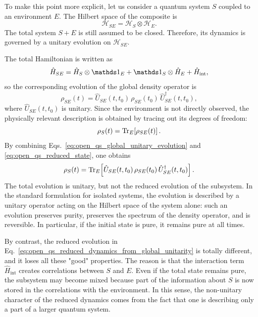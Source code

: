 To make this point more explicit, let us consider a quantum system \(S\) coupled to an environment \(E\). The Hilbert space of the composite is
\begin{equation}
	\mathcal{H}_{SE}=\mathcal{H}_S\otimes\mathcal{H}_E.
	\label{eq:open_qs_total_hilbert_space}
\end{equation}
The total system \(S+E\) is still assumed to be closed. Therefore, its dynamics is governed by a unitary evolution on \(\mathcal{H}_{SE}\).

The total Hamiltonian is written as
\begin{equation}
	\hat H_{SE}
	=
	\hat H_S\otimes\id_E
	+
	\id_S\otimes\hat H_E
	+
	\hat H_{\mathrm{int}},
	\label{eq:open_qs_total_hamiltonian}
\end{equation}
so the corresponding evolution of the global density operator is
\begin{equation}
	\rho_{SE}(t)
	=
	\hat U_{SE}(t,t_0)\,\rho_{SE}(t_0)\,\hat U_{SE}^\dagger(t,t_0),
	\label{eq:open_qs_global_unitary_evolution}
\end{equation}
where \(\hat U_{SE}(t,t_0)\) is unitary. Since the environment is not directly observed, the physically relevant description is obtained by tracing out its degrees of freedom:
\begin{equation}
	\rho_S(t)=\Tr_E\!\left[\rho_{SE}(t)\right].
	\label{eq:open_qs_reduced_state}
\end{equation}
By combining Eqs.~\eqref{eq:open_qs_global_unitary_evolution} and \eqref{eq:open_qs_reduced_state}, one obtains
\begin{equation}
	\rho_S(t)
	=
	\Tr_E\!\left[
	\hat U_{SE}(t,t_0)\,\rho_{SE}(t_0)\,\hat U_{SE}^\dagger(t,t_0)
	\right].
	\label{eq:open_qs_reduced_dynamics_from_global_unitarity}
\end{equation}
The total evolution is unitary, but not the reduced evolution of the subsystem.
In the standard formulation for isolated systems, the evolution is described by a unitary operator acting on the Hilbert space of the system alone: such an evolution preserves purity, preserves the spectrum of the density operator, and is reversible. In particular, if the initial state is pure, it remains pure at all times.

By contrast, the reduced evolution in Eq.~\eqref{eq:open_qs_reduced_dynamics_from_global_unitarity} is totally different, and it loses all these "good" properties. The reason is that the interaction term \(\hat H_{\mathrm{int}}\) creates correlations between \(S\) and \(E\). Even if the total state remains pure, the subsystem may become mixed because part of the information about \(S\) is now stored in the correlations with the environment. In this sense, the non-unitary character of the reduced dynamics comes from the fact that one is describing only a part of a larger quantum system.

